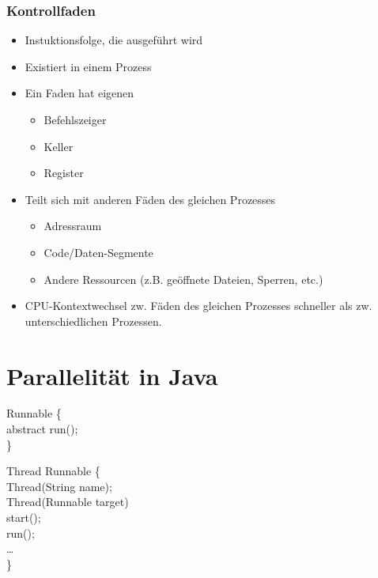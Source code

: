 \subsubsection{Kontrollfaden}
\begin{itemize}
    \item Instuktionsfolge, die ausgeführt wird
    \item Existiert in einem Prozess
    \item Ein Faden hat eigenen 
    \begin{itemize}
        \item Befehlszeiger
        \item Keller
        \item Register
    \end{itemize}
    \item Teilt sich mit anderen Fäden des gleichen Prozesses
    \begin{itemize}
        \item Adressraum
        \item Code/Daten-Segmente
        \item Andere Ressourcen (z.B. geöffnete Dateien, Sperren, etc.)
    \end{itemize}
    \item CPU-Kontextwechsel zw. Fäden des gleichen Prozesses schneller als zw. unterschiedlichen Prozessen.
\end{itemize}


\newpage
\section{Parallelität in Java}
    \begin{code}
        \javaPublic {}Runnable \{\\
        \null\quad\javaPublic abstract \javaVoid run();\\
        \}\\
    \end{code}
    \begin{code}
        \javaPublic \javaClass Thread Runnable \{\\
        \null\quad\javaPublic Thread(String name);\\
        \null\quad\javaPublic Thread(Runnable target)\\
        \null\quad\javaPublic \javaVoid start();\\
        \null\quad\javaPublic \javaVoid run();\\
        \null\quad\dots\\
        \}\\
    \end{code}

